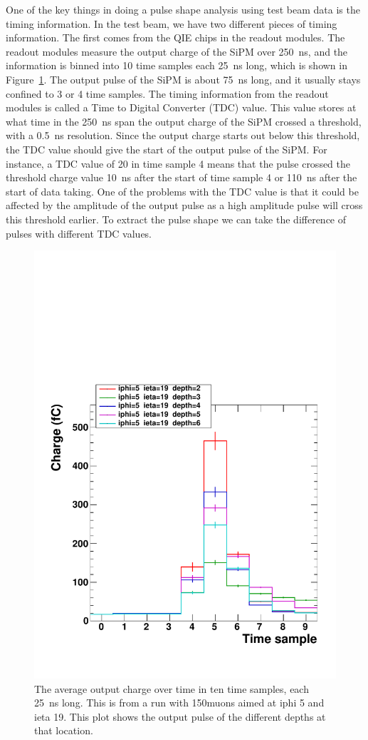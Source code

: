 One of the key things in doing a pulse shape analysis using test beam data is the timing information. In the test beam, we have two different pieces of timing information. The first comes from the QIE chips in the readout modules. The readout modules measure the output charge of the SiPM over 250~ns, and the information is binned into 10 time samples each 25~ns long, which is shown in Figure~\ref{fig:PulSh}. The output pulse of the SiPM is about 75~ns long, and it usually stays confined to 3 or 4 time samples. The timing information from the readout modules is called a Time to Digital Converter (TDC) value. This value stores at what time in the 250~ns span the output charge of the SiPM crossed a threshold, with a 0.5~ns resolution. Since the output charge starts out below this threshold, the TDC value should give the start of the output pulse of the SiPM. For instance, a TDC value of 20 in time sample 4 means that the pulse crossed the threshold charge value 10~ns after the start of time sample 4 or 110~ns after the start of data taking. One of the problems with the TDC value is that it could be affected by the amplitude of the output pulse as a high amplitude pulse will cross this threshold earlier. To extract the pulse shape we can take the difference of pulses with different TDC values. 

\begin{figure}
\centering
\includegraphics[width=0.6\linewidth]{Figures/Pulse.pdf}
\caption{The average output charge over time in ten time samples, each 25~ns long. This is from a run with 150\GeV\space muons aimed at iphi 5 and ieta 19. This plot shows the output pulse of the different depths at that location.}
\label{fig:PulSh}
\end{figure}

